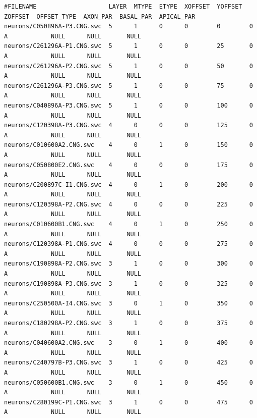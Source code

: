 {\tiny
\begin{verbatim}
#FILENAME                    LAYER  MTYPE  ETYPE  XOFFSET  YOFFSET  ZOFFSET  OFFSET_TYPE  AXON_PAR  BASAL_PAR  APICAL_PAR
neurons/C050896A-P3.CNG.swc  5      1      0      0        0        0        A            NULL      NULL       NULL
neurons/C261296A-P1.CNG.swc  5      1      0      0        25       0        A            NULL      NULL       NULL
neurons/C261296A-P2.CNG.swc  5      1      0      0        50       0        A            NULL      NULL       NULL
neurons/C261296A-P3.CNG.swc  5      1      0      0        75       0        A            NULL      NULL       NULL
neurons/C040896A-P3.CNG.swc  5      1      0      0        100      0        A            NULL      NULL       NULL
neurons/C120398A-P3.CNG.swc  4      0      0      0        125      0        A            NULL      NULL       NULL
neurons/C010600A2.CNG.swc    4      0      1      0        150      0        A            NULL      NULL       NULL
neurons/C050800E2.CNG.swc    4      0      0      0        175      0        A            NULL      NULL       NULL
neurons/C200897C-I1.CNG.swc  4      0      1      0        200      0        A            NULL      NULL       NULL
neurons/C120398A-P2.CNG.swc  4      0      0      0        225      0        A            NULL      NULL       NULL
neurons/C010600B1.CNG.swc    4      0      1      0        250      0        A            NULL      NULL       NULL
neurons/C120398A-P1.CNG.swc  4      0      0      0        275      0        A            NULL      NULL       NULL
neurons/C190898A-P2.CNG.swc  3      1      0      0        300      0        A            NULL      NULL       NULL
neurons/C190898A-P3.CNG.swc  3      1      0      0        325      0        A            NULL      NULL       NULL
neurons/C250500A-I4.CNG.swc  3      0      1      0        350      0        A            NULL      NULL       NULL
neurons/C180298A-P2.CNG.swc  3      1      0      0        375      0        A            NULL      NULL       NULL
neurons/C040600A2.CNG.swc    3      0      1      0        400      0        A            NULL      NULL       NULL
neurons/C240797B-P3.CNG.swc  3      1      0      0        425      0        A            NULL      NULL       NULL
neurons/C050600B1.CNG.swc    3      0      1      0        450      0        A            NULL      NULL       NULL
neurons/C280199C-P1.CNG.swc  3      1      0      0        475      0        A            NULL      NULL       NULL
\end{verbatim}
}

